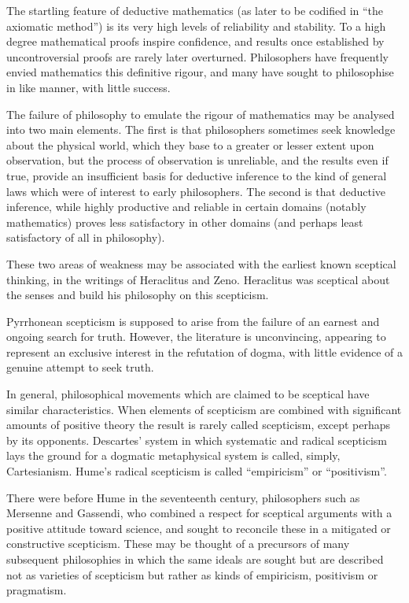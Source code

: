 \documentclass{rbjk}
\begin{document}
\begin{article}
The startling feature of deductive mathematics (as later to be codified in ``the axiomatic method'') is its very high levels of reliability and stability.
To a high degree mathematical proofs inspire confidence, and results once established by uncontroversial proofs are rarely later overturned.
Philosophers have frequently envied mathematics this definitive rigour, and many have sought to philosophise in like manner, with little success.

The failure of philosophy to emulate the rigour of mathematics may be analysed into two main elements.
The first is that philosophers sometimes seek knowledge about the physical world, which they base to a greater or lesser extent upon observation, but the process of observation is unreliable, and the results even if true, provide an insufficient basis for deductive inference to the kind of general laws which were of interest to early philosophers.
The second is that deductive inference, while highly productive and reliable in certain domains (notably mathematics) proves less satisfactory in other domains (and perhaps least satisfactory of all in philosophy).

These two areas of weakness may be associated with the earliest known sceptical thinking, in the writings of Heraclitus and Zeno.
Heraclitus was sceptical about the senses and build his philosophy on this scepticism.

Pyrrhonean scepticism is supposed to arise from the failure of an earnest and ongoing search for truth.
However, the literature is unconvincing, appearing to represent an exclusive interest in the refutation of dogma, with little evidence of a genuine attempt to seek truth.

In general, philosophical movements which are claimed to be sceptical have similar characteristics.
When elements of scepticism are combined with significant amounts of positive theory the result is rarely called scepticism, except perhaps by its opponents.
Descartes' system in which systematic and radical scepticism lays the ground for a dogmatic metaphysical system is called, simply, Cartesianism.
Hume's radical scepticism is called ``empiricism'' or ``positivism''.

There were before Hume in the seventeenth century, philosophers such as Mersenne and Gassendi, who combined a respect for sceptical arguments with a positive attitude toward science, and sought to reconcile these in a mitigated or constructive scepticism.
These may be thought of a precursors of many subsequent philosophies in which the same ideals are sought but are described not as varieties of scepticism but rather as kinds of empiricism, positivism or pragmatism.


\end{article}
\end{document}
